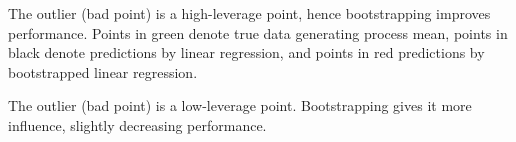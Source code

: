 \begin{example}
The outlier (bad point) is a high-leverage point, hence bootstrapping improves performance. Points in green denote true data generating process mean, points in black denote predictions by linear regression, and points in red predictions by bootstrapped linear regression.

\end{example}

\begin{example}
The outlier (bad point) is a low-leverage point. Bootstrapping gives it more influence, slightly decreasing performance.

\end{example}

